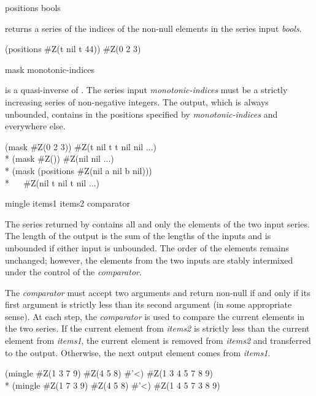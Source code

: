 \begin{defun}[Function]
positions bools

 returns a series of the indices of the non-null elements in
the series input {\it bools}.
\begin{lisp}
(positions \#Z(t nil t 44)) {\EV} \#Z(0 2 3)
\end{lisp}
\end{defun}

\begin{defun}[Function]
mask monotonic-indices

 is a quasi-inverse of .  The series input {\it
monotonic-indices} must be a strictly increasing series of non-negative
integers.  The output, which is always unbounded, contains  in the
positions specified by {\it monotonic-indices} and  everywhere else.
\begin{lisp}
(mask \#Z(0 2 3)) {\EV} \#Z(t nil t t nil nil ...) \\*
(mask \#Z()) {\EV} \#Z(nil nil ...) \\*
(mask (positions \#Z(nil a nil b nil))) \\*
~~{\EV} \#Z(nil t nil t nil ...)
\end{lisp}
\end{defun}


\begin{defun}[Function]
mingle items1 items2 comparator

The series returned by  contains all and only the elements of
the two input series.  The length of the output is the sum of the lengths
of the inputs and is unbounded if either input is unbounded.  The order of
the elements remains unchanged; however, the elements from the two inputs
are stably intermixed under the control of the {\it comparator}.

The {\it comparator} must accept two arguments and return non-null if and only
if its first argument is strictly less than its second argument (in some
appropriate sense).  At each step, the {\it comparator} is used to compare
the current elements in the two series.  If the current element from {\it
items2} is strictly less than the current element from {\it items1}, the
current element is removed from {\it items2} and transferred to the output.
Otherwise, the next output element comes from {\it items1}.
\begin{lisp}
(mingle \#Z(1 3 7 9) \#Z(4 5 8) \#'<) {\EV} \#Z(1 3 4 5 7 8 9) \\*
(mingle \#Z(1 7 3 9) \#Z(4 5 8) \#'<) {\EV} \#Z(1 4 5 7 3 8 9)
\end{lisp}
\end{defun}

